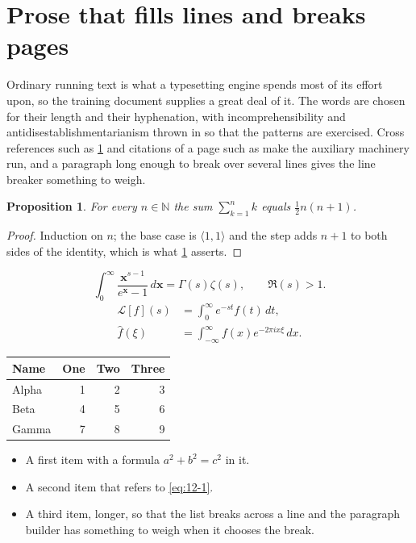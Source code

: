 \documentclass[11pt,a4paper]{report}
\theoremstyle{plain}
\newtheorem{proposition}{Proposition}[chapter]
\newcommand{\vecn}[1]{\mathbf{#1}}
\newcommand{\pairs}[2]{\langle #1,#2\rangle}
\begin{document}
\section{Prose that fills lines and breaks pages}
\label{sec:prose12-1}
Ordinary running text is what a typesetting engine spends most of its effort
upon, so the training document supplies a great deal of it. The words are
chosen for their length and their hyphenation, with incomprehensibility and
antidisestablishmentarianism thrown in so that the patterns are exercised.
Cross references such as \cref{sec:prose12-1} and citations of a page such
as \pageref{sec:prose12-1} make the auxiliary machinery run, and a
paragraph long enough to break over several lines gives the line breaker
something to weigh.
\begin{proposition}\label{prop:12-1}
For every $n\in\mathbb{N}$ the sum $\sum_{k=1}^{n}k$ equals
$\tfrac{1}{2}n(n+1)$.
\end{proposition}
\begin{proof}
Induction on $n$; the base case is $\pairs{1}{1}$ and the step adds $n+1$ to
both sides of the identity, which is what \cref{prop:12-1} asserts.
\end{proof}
\begin{equation}\label{eq:12-1}
  \int_{0}^{\infty}\frac{\vecn{x}^{s-1}}{e^{\vecn{x}}-1}\,d\vecn{x}
    = \Gamma(s)\zeta(s),\qquad \Re(s)>1 .
\end{equation}
\begin{align}
  \mathcal{L}[f](s) &= \int_{0}^{\infty} e^{-st} f(t)\,dt, \\
  \widehat{f}(\xi)  &= \int_{-\infty}^{\infty} f(x) e^{-2\pi i x\xi}\,dx .
\end{align}
\par\noindent\begin{center}
\begin{tabular}{lrrr}
\hline
Name & One & Two & Three \\
\hline
Alpha & 1 & 2 & 3 \\
Beta & 4 & 5 & 6 \\
Gamma & 7 & 8 & 9 \\
\hline
\end{tabular}
\end{center}
\begin{itemize}
  \item A first item with a formula $a^2+b^2=c^2$ in it.
  \item A second item that refers to \eqref{eq:12-1}.
  \item A third item, longer, so that the list breaks across a line and the
    paragraph builder has something to weigh when it chooses the break.
\end{itemize}
\end{document}
